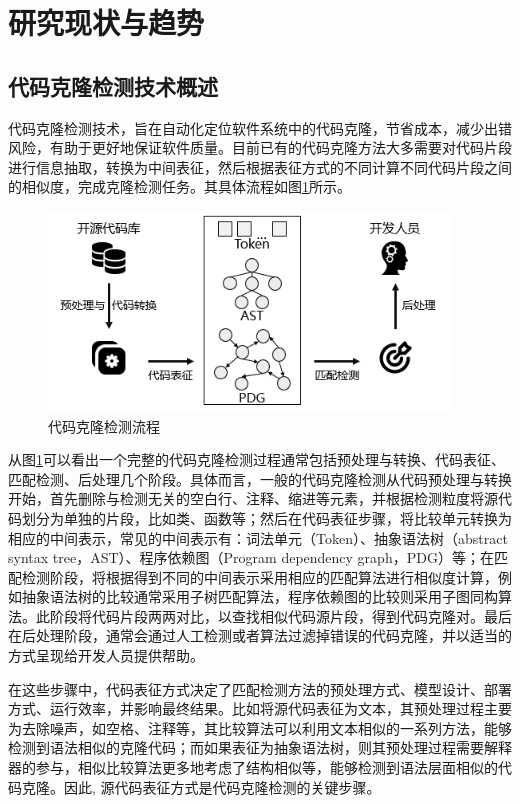 \section{研究现状与趋势}

\subsection{代码克隆检测技术概述}
代码克隆检测技术，旨在自动化定位软件系统中的代码克隆，节省成本，减少出错风险，有助于更好地保证软件质量。目前已有的代码克隆方法大多需要对代码片段进行信息抽取，转换为中间表征，然后根据表征方式的不同计算不同代码片段之间的相似度，完成克隆检测任务。其具体流程如图\ref{fig:figure1}所示。
\begin{figure}[H]
    \centering
    \includegraphics[width=0.95\textwidth]{figures/figure1}
    \caption{代码克隆检测流程}\label{fig:figure1}
\end{figure}

从图\ref{fig:figure1}可以看出一个完整的代码克隆检测过程通常包括预处理与转换、代码表征、匹配检测、后处理几个阶段。具体而言，一般的代码克隆检测从代码预处理与转换开始，首先删除与检测无关的空白行、注释、缩进等元素，并根据检测粒度将源代码划分为单独的片段，比如类、函数等；然后在代码表征步骤，将比较单元转换为相应的中间表示，常见的中间表示有：词法单元（Token）、抽象语法树（abstract syntax tree，AST）、程序依赖图（Program dependency graph，PDG）等；在匹配检测阶段，将根据得到不同的中间表示采用相应的匹配算法进行相似度计算，例如抽象语法树的比较通常采用子树匹配算法，程序依赖图的比较则采用子图同构算法。此阶段将代码片段两两对比，以查找相似代码源片段，得到代码克隆对。最后在后处理阶段，通常会通过人工检测或者算法过滤掉错误的代码克隆，并以适当的方式呈现给开发人员提供帮助。

在这些步骤中，代码表征方式决定了匹配检测方法的预处理方式、模型设计、部署方式、运行效率，并影响最终结果\cite{陈秋远2019代码克隆检测研究进展}。比如将源代码表征为文本，其预处理过程主要为去除噪声，如空格、注释等，其比较算法可以利用文本相似的一系列方法，能够检测到语法相似的克隆代码；而如果表征为抽象语法树，则其预处理过程需要解释器的参与，相似比较算法更多地考虑了结构相似等，能够检测到语法层面相似的代码克隆。因此, 源代码表征方式是代码克隆检测的关键步骤。

